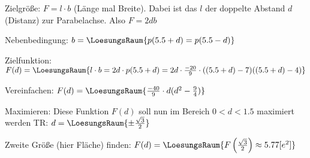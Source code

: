 Zielgröße: $F = l\cdot{}b$ (Länge mal Breite). Dabei ist das $l$ der doppelte Abstand $d$ (Distanz) zur Parabelachse.
Also $F = 2db$

Nebenbedingung: $b = \LoesungsRaum{p(5.5 + d) = p(5.5-d)}$

Zielfunktion: $F(d) = \LoesungsRaum{l\cdot{}b = 2d\cdot{}p(5.5+d) = 2d\cdot{}\frac{-20}9\cdot((5.5+d)-7)((5.5+d)-4)}$

Vereinfachen:
$F(d) = \LoesungsRaum{\frac{-40}9\cdot{}d(d^2-\frac94)}$

Maximieren: Diese Funktion $F(d)$ soll nun im Bereich $0<d<1.5$ maximiert werden TR: $d = \LoesungsRaum{\pm\frac{\sqrt{3}}2}$

Zweite Größe (hier Fläche) finden: $F(d) = \LoesungsRaum{F\left(\frac{\sqrt{3}}2\right) \approx 5.77 [e^2]}$


